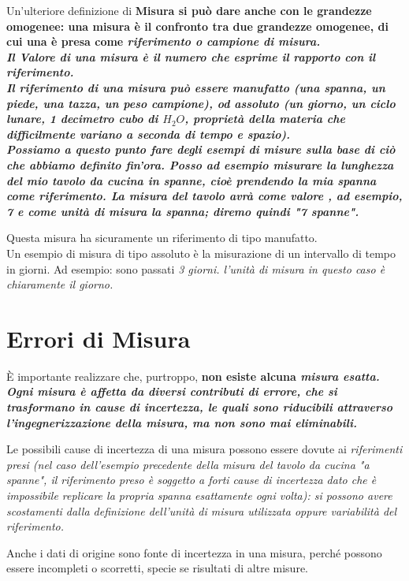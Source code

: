 \documentclass[a4paper,11pt]{report}
\begin{document}
Un'ulteriore definizione di \bf Misura \rm si può dare anche con le grandezze omogenee: una misura è il confronto tra due grandezze omogenee, di cui una è presa come \it riferimento \rm o \it campione di misura\rm.
\\

Il \bf Valore \rm di una misura è il numero che esprime il rapporto con il riferimento.
\\

Il riferimento di una misura può essere manufatto (una spanna, un piede, una tazza, un peso campione), od assoluto (un giorno, un ciclo lunare, 1 decimetro cubo di $H_2O$, proprietà della materia che difficilmente variano a seconda di tempo e spazio).
\\

Possiamo a questo punto fare degli esempi di misure sulla base di ciò che abbiamo definito fin'ora. Posso ad esempio misurare la lunghezza del mio tavolo da cucina in spanne, cioè prendendo la mia spanna come \bf riferimento\rm. La misura del tavolo avrà come \bf valore \rm, ad esempio, 7 e come unità di misura la spanna; diremo quindi "7 spanne".

Questa misura ha sicuramente un riferimento di tipo manufatto.
\\

Un esempio di misura di tipo assoluto è la misurazione di un intervallo di tempo in giorni. Ad esempio: sono passati \it 3 giorni\rm. l'unità di misura in questo caso è chiaramente il giorno.
\section{Errori di Misura}
È importante realizzare che, purtroppo, \bf non esiste \rm alcuna \it misura esatta\rm. Ogni misura è affetta da diversi contributi di errore, che si trasformano in cause di incertezza, le quali sono riducibili attraverso l'ingegnerizzazione della misura, ma non sono mai eliminabili.

Le possibili cause di incertezza di una misura possono essere dovute ai \it riferimenti \rm presi (nel caso dell'esempio precedente della misura del tavolo da cucina "a spanne", il riferimento preso è soggetto a forti cause di incertezza dato che è impossibile replicare la propria spanna esattamente ogni volta): si possono avere scostamenti dalla definizione dell'unità di misura utilizzata oppure variabilità del riferimento.

Anche i dati di origine sono fonte di incertezza in una misura, perché possono essere incompleti o scorretti, specie se risultati di altre misure.
\end{document}
